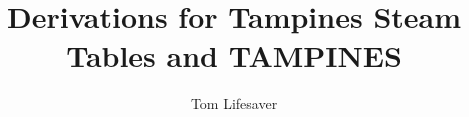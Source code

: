 \documentclass[masters]{ucbthesis}
\renewcommand{\_}{\kern-1.5pt\textunderscore\kern-1.5pt}
\begin{document}

\title{Derivations for Tampines Steam Tables and TAMPINES}
\author{Tom Lifesaver}
%
%



\begin{frontmatter}



\tableofcontents
\clearpage
\listoffigures
\clearpage
\listoftables

\begin{acknowledgements}
\end{acknowledgements}

\end{frontmatter}

\pagestyle{headings}

\end{document}
